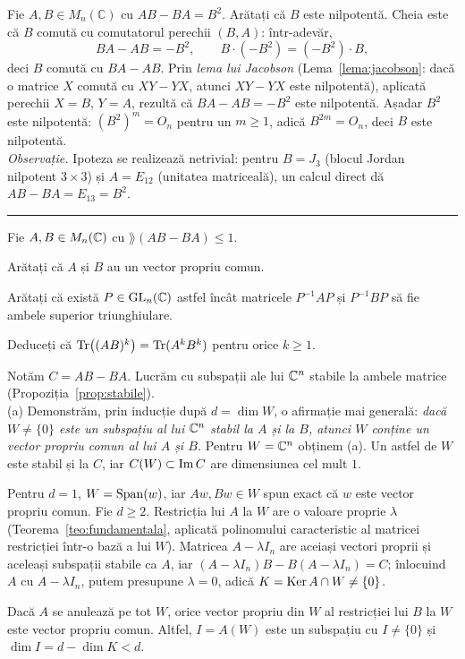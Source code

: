 Fie $A,B\in M_n(\mathbb{C})$ cu $AB-BA=B^2$. Arătați că $B$ este nilpotentă.
\sol Cheia este că $B$ comută cu comutatorul perechii $(B,A)$: într-adevăr,
\[ BA-AB=-B^2,\qquad B\cdot(-B^2)=(-B^2)\cdot B, \]
deci $B$ comută cu $BA-AB$. Prin \emph{lema lui Jacobson} (Lema~\ref{lema:jacobson}: dacă o matrice $X$ comută cu $XY-YX$, atunci $XY-YX$ este nilpotentă), aplicată perechii $X=B$, $Y=A$, rezultă că $BA-AB=-B^2$ este nilpotentă. Așadar $B^2$ este nilpotentă: $(B^2)^m=O_n$ pentru un $m\ge1$, adică $B^{2m}=O_n$, deci $B$ este nilpotentă.\\[2pt]
\emph{Observație.} Ipoteza se realizează netrivial: pentru $B=J_3$ (blocul Jordan nilpotent $3\times3$) și $A=E_{12}$ (unitatea matriceală), un calcul direct dă $AB-BA=E_{13}=B^2$.
\vspace{1mm}\hrule

Fie $A,B\in M_n(\mathbb{C})$ cu $\rang(AB-BA)\le1$.
\begin{parti}
  \item Arătați că $A$ și $B$ au un vector propriu comun.
  \item Arătați că există $P\in\mathrm{GL}_n(\mathbb{C})$ astfel încât matricele $P^{-1}AP$ și $P^{-1}BP$ să fie ambele superior triunghiulare.
  \item Deduceți că $\operatorname{Tr}\bigl((AB)^k\bigr)=\operatorname{Tr}(A^kB^k)$ pentru orice $k\ge1$.
\end{parti}
\sol Notăm $C=AB-BA$. Lucrăm cu subspații ale lui $\mathbb{C}^n$ stabile la ambele matrice (Propoziția~\ref{prop:stabile}).\\[2pt]
(a) Demonstrăm, prin inducție după $d=\dim W$, o afirmație mai generală: \emph{dacă $W\neq\{0\}$ este un subspațiu al lui $\mathbb{C}^n$ stabil la $A$ și la $B$, atunci $W$ conține un vector propriu comun al lui $A$ și $B$.} Pentru $W=\mathbb{C}^n$ obținem (a). Un astfel de $W$ este stabil și la $C$, iar $C(W)\subset\operatorname{Im} C$ are dimensiunea cel mult $1$.

Pentru $d=1$, $W=\operatorname{Span}(w)$, iar $Aw,Bw\in W$ spun exact că $w$ este vector propriu comun. Fie $d\ge2$. Restricția lui $A$ la $W$ are o valoare proprie $\lambda$ (Teorema~\ref{teo:fundamentala}, aplicată polinomului caracteristic al matricei restricției într-o bază a lui $W$). Matricea $A-\lambda I_n$ are aceiași vectori proprii și aceleași subspații stabile ca $A$, iar $(A-\lambda I_n)B-B(A-\lambda I_n)=C$; înlocuind $A$ cu $A-\lambda I_n$, putem presupune $\lambda=0$, adică $K=\operatorname{Ker} A\cap W\neq\{0\}$.

Dacă $A$ se anulează pe tot $W$, orice vector propriu din $W$ al restricției lui $B$ la $W$ este vector propriu comun. Altfel, $I=A(W)$ este un subspațiu cu $I\neq\{0\}$ și $\dim I=d-\dim K<d$.

